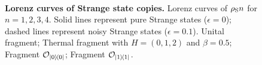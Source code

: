 \documentclass[pra,
aps,
twocolumn,
superscriptaddress,
groupedaddress,
nofootinbib,
reprint
]{revtex4-1}
\begin{document}
\begin{figure}%
    \centering
    \hspace{1pt}%
    \\
    \hspace{1pt}%
    \caption{\textbf{Lorenz curves of Strange state copies.} Lorenz curves of $\rho_{\rm{S}}n$ for $n=1,2,3,4$.
    Solid lines represent pure Strange states ($\epsilon = 0$); dashed lines represent noisy Strange states ($\epsilon = 0.1$).
     Unital fragment;  Thermal fragment with $H = (0,1,2)$ and $\beta = 0.5$;  Fragment $\mathcal{O}_{\ketbra{0}{0}}$;  Fragment $\mathcal{O}_{\ketbra{1}{1}}$.    
    }%
    \label{fig:lcs}
\end{figure}
\end{document}
